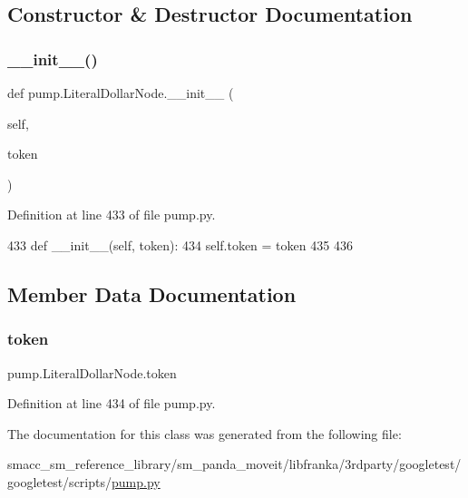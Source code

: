\subsection{Constructor \& Destructor Documentation}
\mbox{\label{classpump_1_1LiteralDollarNode_a181cccad8a48f7dfdd0716e427897e0b}} 
\subsubsection{\texorpdfstring{\+\_\+\+\_\+init\+\_\+\+\_\+()}{\_\_init\_\_()}}
{\footnotesize\ttfamily def pump.\+Literal\+Dollar\+Node.\+\_\+\+\_\+init\+\_\+\+\_\+ (\begin{DoxyParamCaption}\item[{}]{self,  }\item[{}]{token }\end{DoxyParamCaption})}



Definition at line 433 of file pump.\+py.


\begin{DoxyCode}
433   \textcolor{keyword}{def }\_\_init\_\_(self, token):
434     self.token = token
435 
436 
\end{DoxyCode}


\subsection{Member Data Documentation}
\mbox{\label{classpump_1_1LiteralDollarNode_ab4c6e209635b8868bcdf0fe8053431c6}} 
\subsubsection{\texorpdfstring{token}{token}}
{\footnotesize\ttfamily pump.\+Literal\+Dollar\+Node.\+token}



Definition at line 434 of file pump.\+py.



The documentation for this class was generated from the following file\+:\begin{DoxyCompactItemize}
\item 
smacc\+\_\+sm\+\_\+reference\+\_\+library/sm\+\_\+panda\+\_\+moveit/libfranka/3rdparty/googletest/googletest/scripts/\hyperlink{pump_8py}{pump.\+py}\end{DoxyCompactItemize}
